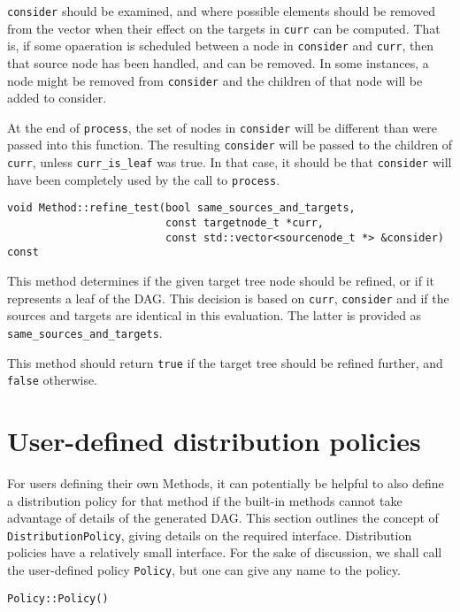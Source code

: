 \texttt{consider} should be examined, and where possible elements should be
removed from the vector when their effect on the targets in \texttt{curr} can
be computed. That is, if some opaeration is scheduled between a node in
\texttt{consider} and \texttt{curr}, then that source node has been handled,
and can be removed. In some instances, a node might be removed from
\texttt{consider} and the children of that node will be added to consider.

At the end of \texttt{process}, the set of nodes in \texttt{consider} will be
different than were passed into this function. The resulting \texttt{consider}
will be passed to the children of \texttt{curr}, unless \texttt{curr\_is\_leaf}
was true. In that case, it should be that \texttt{consider} will have been
completely used by the call to \texttt{process}.

\begin{lstlisting}
void Method::refine_test(bool same_sources_and_targets, 
                         const targetnode_t *curr, 
                         const std::vector<sourcenode_t *> &consider) const
\end{lstlisting}

This method determines if the given target tree node should be refined, or if
it represents a leaf of the DAG. This decision is based on \texttt{curr},
\texttt{consider} and if the sources and targets are identical in this
evaluation. The latter is provided as \texttt{same\_sources\_and\_targets}.

This method should return \texttt{true} if the target tree should be refined
further, and \texttt{false} otherwise.



\section{User-defined distribution policies}

For users defining their own Methods, it can potentially be helpful to also
define a distribution policy for that method if the built-in methods cannot
take advantage of details of the generated DAG. This section outlines the
concept of \texttt{DistributionPolicy}, giving details on the required
interface. Distribution policies have a relatively small interface. For the
sake of discussion, we shall call the user-defined policy \texttt{Policy},
but one can give any name to the policy.

\begin{lstlisting}
Policy::Policy()
\end{lstlisting}


